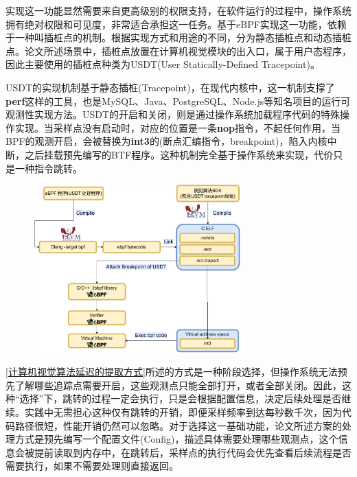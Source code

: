 \documentclass[master,anonymous]{shtthesis}
\begin{document}
实现这一功能显然需要来自更高级别的权限支持，在软件运行的过程中，操作系统拥有绝对权限和可见度，非常适合承担这一任务。基于eBPF实现这一功能，依赖于一种叫插桩点的机制。根据实现方式和用途的不同，分为静态插桩点和动态插桩点。论文所述场景中，插桩点放置在计算机视觉模块的出入口，属于用户态程序，因此主要使用的插桩点种类为USDT(User Statically-Defined Tracepoint)。

USDT的实现机制基于静态插桩(Tracepoint)，在现代内核中，这一机制支撑了\textbf{perf}\cite{de2010new}这样的工具，也是MySQL、Java、PostgreSQL、Node.js等知名项目的运行可观测性实现方法。USDT的开启和关闭，则是通过操作系统加载程序代码的特殊操作实现。当采样点没有启动时，对应的位置是一条\textbf{nop}指令，不起任何作用，当BPF的观测开启，会被替换为\textbf{int3}的(断点汇编指令，breakpoint)，陷入内核中断，之后挂载预先编写的BTF程序。这种机制完全基于操作系统来实现，代价只是一种指令跳转。
\begin{figure}[htbp]
	\centering
	\includegraphics[width=8cm]{img/usdt.pdf}
	\label{使用USDT构造视觉算法运行时采样点}
\end{figure}

\ref{计算机视觉算法延迟的提取方式}所述的方式是一种阶段选择，但操作系统无法预先了解哪些追踪点需要开启，这些观测点只能全部打开，或者全部关闭。因此，这种“选择”下，跳转的过程一定会执行，只是会根据配置信息，决定后续处理是否继续。实践中无需担心这种仅有跳转的开销，即便采样频率到达每秒数千次，因为代码路径很短，性能开销仍然可以忽略。对于选择这一基础功能，论文所述方案的处理方式是预先编写一个配置文件(Config)，描述具体需要处理哪些观测点，这个信息会被提前读取到内存中，在跳转后，采样点的执行代码会优先查看后续流程是否需要执行，如果不需要处理则直接返回。
\end{document}
